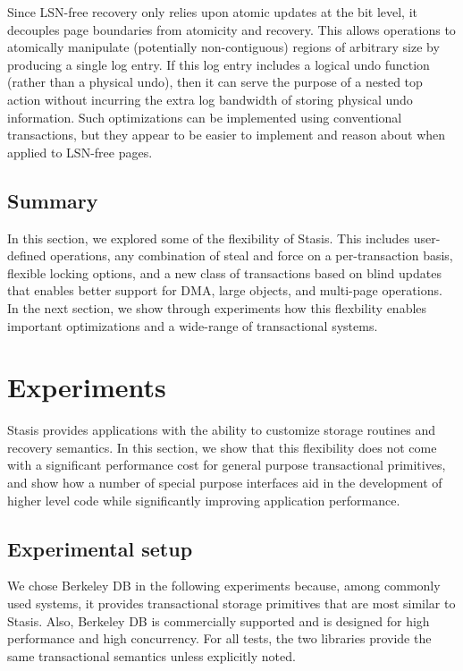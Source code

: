 \documentclass[letterpaper,twocolumn,10pt]{article}
\newcommand{\yad}{Stasis\xspace}
\begin{document}
Since LSN-free recovery only relies upon atomic updates at the bit
level, it decouples page boundaries from atomicity and recovery.  This
allows operations to atomically manipulate (potentially
non-contiguous) regions of arbitrary size by producing a single log
entry.  If this log entry includes a logical undo function (rather
than a physical undo), then it can serve the purpose of a nested top
action without incurring the extra log bandwidth of storing physical
undo information.  Such optimizations can be implemented using
conventional transactions, but they appear to be easier to implement
and reason about when applied to LSN-free pages.

\subsection{Summary}

In this section, we explored some of the flexibility of \yad. This
includes user-defined operations, any combination of steal and force on
a per-transaction basis, flexible locking options, and a new class of
transactions based on blind updates that enables better support for
DMA, large objects, and multi-page operations.  In the next section,
we show through experiments how this flexbility enables important
optimizations and a wide-range of transactional systems.




\section{Experiments}
\label{experiments}

\yad provides applications with the ability to customize storage
routines and recovery semantics.  In this section, we show that this
flexibility does not come with a significant performance cost for
general purpose transactional primitives, and show how a number of
special purpose interfaces aid in the development of higher level 
code while significantly improving application performance.

\subsection{Experimental setup}
\label{sec:experimental_setup}

We chose Berkeley DB in the following experiments because, among
commonly used systems, it provides transactional storage primitives
that are most similar to \yad.  Also, Berkeley DB is 
commercially supported and is designed for high performance and high
concurrency.  For all tests, the two libraries provide the same
transactional semantics unless explicitly noted.
\end{document}
